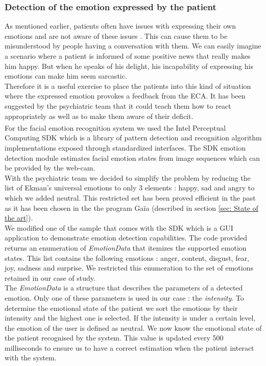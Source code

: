 \documentclass[11pt]{article}
\begin{document}
\subsubsection{Detection of the emotion expressed by the patient}
As mentioned earlier, patients often have issues with expressing their own emotions and are not aware of these issues \citep{Weiss09, Peyroux14}. This can cause them to be misunderstood by people having a conversation with them. We can easily imagine a scenario where a patient is informed of some positive news that really makes him happy. But when he speaks of his delight, his incapability of expressing his emotions can make him seem sarcastic. \\

Therefore it is a useful exercise to place the patients into this kind of situation where the expressed emotion provokes a feedback from the ECA. It has been suggested by the psychiatric team that it could teach them how to react appropriately as well as to make them aware of their deficit. \\

For the facial emotion recognition system we used the Intel\textsuperscript{\textregistered} Perceptual Computing SDK which is a library of pattern detection and recognition algorithm implementations exposed through standardized interfaces. The SDK emotion detection module estimates facial emotion states from image sequences which can be provided by the web-cam. \\

With the psychiatric team we decided to simplify the problem by reducing the list of Ekman's universal emotions \citep{Ekman77} to only 3 elements : happy, sad and angry to which we added neutral. This restricted set has been proved efficient in the past as it has been chosen in the the program Ga\"{i}a \citep{Gaudelus12} (described in section \ref{sec: State of the art}). \\

We modified one of the sample that comes with the SDK which is a GUI application to demonstrate emotion detection capabilities. The code provided returns an enumeration of \emph{EmotionData} that itemizes the supported emotion states. This list contains the following emotions : anger, content, disgust, fear, joy, sadness and surprise. We restricted this enumeration to the set of emotions retained in our case of study.\\

The \emph{EmotionData} is a structure that describes the parameters of a detected emotion. Only one of these parameters is used in our case : the \emph{intensity}. To determine the emotional state of the patient we sort the emotions by their intensity and the highest one is selected. If the intensity is under a certain level, the emotion of the user is defined as neutral. We now know the emotional state of the patient recognised by the system. This value is updated every 500 milliseconds to ensure us to have a correct estimation when the patient interact with the system.
\end{document}
